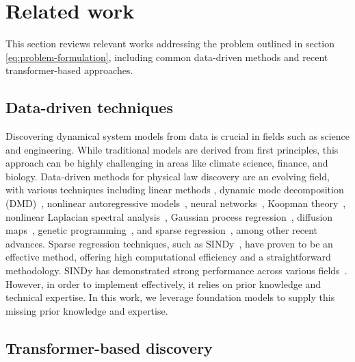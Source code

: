 \documentclass{article}
\begin{document}
\section{Related work}

This section reviews relevant works addressing the problem outlined in section \ref{eq:problem-formulation}, including common data-driven methods and recent transformer-based approaches.

\subsection{Data-driven techniques}

Discovering dynamical system models from data is crucial in fields such as science and engineering.
While traditional models are derived from first principles, this approach can be highly challenging in areas like climate science, finance, and biology. 
Data-driven methods for physical law discovery are an evolving field, 
with various techniques including
linear methods \cite{nellesnonlinear, ljung2010perspectives}, 
dynamic mode decomposition (DMD)~\cite{schmid2010dynamic, kutz2016dynamic}, 
nonlinear autoregressive models~\cite{akaike1969autoregressive,billings2013nonlinear}, 
neural networks~\cite{yang2020physics,wehmeyer2018time,mardt2018vampnets,vlachas2018data,pathak2018model,lu2021deepxde,raissi2019physics,champion2019data,raissi2020hidden}, 
Koopman theory~\cite{budivsic2012applied,mezic2013analysis,williams2015data,klus2018data},
nonlinear Laplacian spectral analysis~\cite{giannakis2012nonlinear}, 
Gaussian process regression~\cite{raissi2017machine,raissi2018hidden}, 
diffusion maps~\cite{yair2017reconstruction}, 
genetic programming~\cite{daniels2015automated,schmidt2009distilling,bongard2007automated}, and 
sparse regression~\cite{Brunton2016,rudy2017data,schaeffer2017learning}, among other recent advances.
Sparse regression techniques, such as SINDy~\cite{Brunton2016}, have proven to be an effective method, offering high computational efficiency and a straightforward methodology. 
SINDy has demonstrated strong performance across various fields~\cite{Shea_2021,MESSENGER2021110525,kaheman2020sindy,Fasel_2022}. 
However, in order to implement effectively, it relies on prior knowledge and technical expertise. 
In this work, we leverage foundation models to supply this missing prior knowledge and expertise.

\subsection{Transformer-based discovery}
\end{document}
